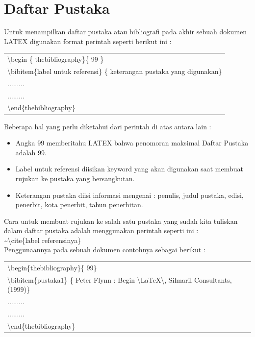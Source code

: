 \section{Daftar Pustaka}
Untuk menampilkan daftar pustaka atau bibliografi pada akhir sebuah dokumen LATEX digunakan format perintah seperti berikut ini :\\[0.5 cm]
\begin{tabular}{|p{13.5 cm}|}
\hline
 \textbackslash begin \{ thebibliography\}\{ 99 \} \\
 \textbackslash bibitem\{label untuk referensi\} \{ keterangan pustaka yang digunakan\}\\
.........\\
.........\\
 \textbackslash end\{thebibliography\}\\
\hline
\end{tabular}
\newpage
{} 
\newpage
Beberapa hal yang perlu diketahui dari perintah di atas antara lain :\\
\begin{itemize}
\item	Angka 99 memberitahu LATEX bahwa penomoran maksimal Daftar Pustaka adalah 99.
\item	Label untuk referensi diisikan keyword yang akan digunakan saat membuat rujukan ke pustaka yang bersangkutan.
\item	 Keterangan pustaka diisi informasi mengenai : penulis, judul pustaka, edisi, penerbit, kota penerbit, tahun penerbitan.
\end{itemize}
Cara untuk membuat rujukan ke salah satu pustaka yang sudah kita tuliskan dalam daftar pustaka adalah menggunakan perintah seperti ini :\\
\~{}\textbackslash cite\{label referensinya\}\\
Penggunaannya pada sebuah dokumen contohnya sebagai berikut :\\[0.5 cm]
\begin{tabular}{|p{13.5 cm}|}
\hline
\textbackslash begin\{thebibliography\}\{ 99\}\\
\textbackslash bibitem\{pustaka1\} \{ Peter Flynn : Begin \textbackslash LaTeX\textbackslash, Silmaril Consultants, (1999)\}\\
.........\\
.........\\
\textbackslash end\{thebibliography\}\\
\hline
\end{tabular}
